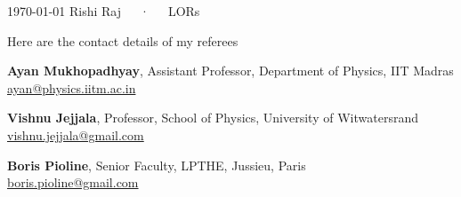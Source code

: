 \documentclass[11pt, a4paper]{awesome-cv}
\begin{document}
\makecvheader[R]

\makecvfooter
  {\today}
  {Rishi Raj~~~·~~~LORs}
  {}

\makelettertitle

\begin{cvletter}

Here are the contact details of my referees

{\bfseries Ayan Mukhopadhyay}, Assistant Professor, Department of Physics, IIT Madras \\
\href{mailto:ayan@physics.iitm.ac.in}{\faEnvelope\acvHeaderIconSep ayan@physics.iitm.ac.in}

{\bfseries Vishnu Jejjala}, Professor, School of Physics, University of Witwatersrand \\
\href{mailto:vishnu.jejjala@gmail.com}{\faEnvelope\acvHeaderIconSep vishnu.jejjala@gmail.com}

{\bfseries Boris Pioline}, Senior Faculty, LPTHE, Jussieu, Paris \\
\href{mailto:boris.pioline@gmail.com}{\faEnvelope\acvHeaderIconSep boris.pioline@gmail.com}

\end{cvletter}


\makeletterclosing
\end{document}
